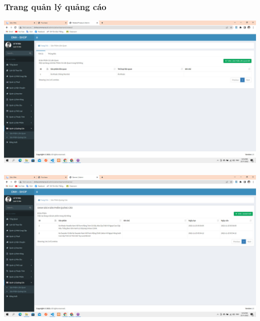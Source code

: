 \documentclass[12pt,a4paper,2sides]{report}
\begin{document}
\subsubsection{Trang quản lý quảng cáo}
    \includegraphics[width=1\linewidth]{lib/results/splienquan.jpg}\\\vspace*{1cm}  
    \hspace{4cm}{Hình 53. Quản lý sản phẩm liên quan}\\
    \includegraphics[width=1\linewidth]{lib/results/spquangcao.jpg}\\\vspace*{1cm} 
    \hspace{4cm}{Hình 54. Quản lý sản phẩm cần quảng cáo}\\
\end{document}
